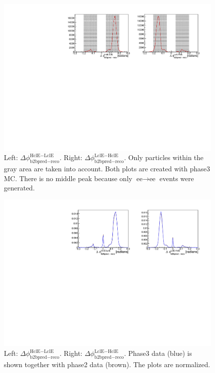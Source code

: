 \documentclass[a4paper,11pt,twosided,final,german,openbib,pdftex,listof=totoc,bibliography=totoc]{scrbook}
\begin{document}
\begin{appendix}
\begin{figure}[h!]
	\centering
	\includegraphics[width=\textwidth]{Plots/master3/hb2b_MCP3.pdf}
	\caption[b2bClusterPhi - clusterPhi For Phase3 MC]{Left: $\Delta \phi _{\textrm{b2bpred} - \textrm{reco}}^{\textrm{HclE}-\textrm{LclE}}$. Right:  $\Delta \phi _{\textrm{b2bpred} - \textrm{reco}}^{\textrm{LclE}-\textrm{HclE}}$. Only particles within the gray area are taken into account. Both plots are created with phase3 MC. There is no middle peak because only $\textrm{ee} \rightarrow \textrm{ee}$ events were generated.}
	\label{fig:b2bMC3}
\end{figure}










\begin{figure}[h!]
	\centering
	\includegraphics[width=\textwidth]{Plots/comp/cb2b.pdf}
	\caption[Normalized b2bClusterPhi - clusterPhi For Phase2 Data And Phase3 Data]{Left: $\Delta \phi _{\textrm{b2bpred} - \textrm{reco}}^{\textrm{HclE}-\textrm{LclE}}$. Right:  $\Delta \phi _{\textrm{b2bpred} - \textrm{reco}}^{\textrm{LclE}-\textrm{HclE}}$. Phase3 data (blue) is shown together with phase2 data (brown). The plots are normalized.}
	\label{fig:Cb2bData}
\end{figure}






\end{appendix}
\end{document}
